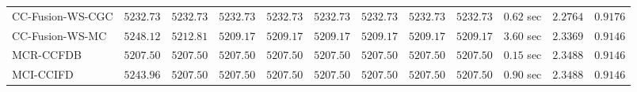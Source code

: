 \begin{table}[H]
\begin{tabular}{lrrrrrrrrrrr}
    CC-Fusion-WS-CGC & $      5232.73$ & $      5232.73$ & $      5232.73$ & $      5232.73$ & $      5232.73$ & $      5232.73$ & $      5232.73$ & $      5232.73$ & $         0.62$ sec    & $       2.2764$  & $       0.9176$ \\ 
     CC-Fusion-WS-MC & $      5248.12$ & $      5212.81$ & $      5209.17$ & $      5209.17$ & $      5209.17$ & $      5209.17$ & $      5209.17$ & $      5209.17$ & $         3.60$ sec    & $       2.3369$  & $       0.9146$ \\ 
\cmidrule{1-1} 
           MCR-CCFDB & $      5207.50$ & $      5207.50$ & $      5207.50$ & $      5207.50$ & $      5207.50$ & $      5207.50$ & $      5207.50$ & $      5207.50$ & $         0.15$ sec    & $       2.3488$  & $       0.9146$ \\ 
\cmidrule{1-1} 
           MCI-CCIFD & $      5243.96$ & $      5207.50$ & $      5207.50$ & $      5207.50$ & $      5207.50$ & $      5207.50$ & $      5207.50$ & $      5207.50$ & $         0.90$ sec    & $       2.3488$  & $       0.9146$ \\ 
\bottomrule
\end{tabular}
\end{table}

